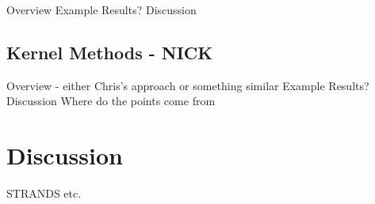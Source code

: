 \documentclass[11pt,letterpaper]{article}
\begin{document}
Overview
Example
Results?
Discussion

\subsection{Kernel Methods - NICK}

Overview - either Chris’s approach or something similar
Example
Results?
Discussion 
Where do the points come from

\section{Discussion}
 
\begin{acknowledgements} 
\noindent
STRANDS etc.
\end{acknowledgements} 




\vspace{-0.25in}

{\parindent -10pt\leftskip 10pt\noindent



}

\end{document}
